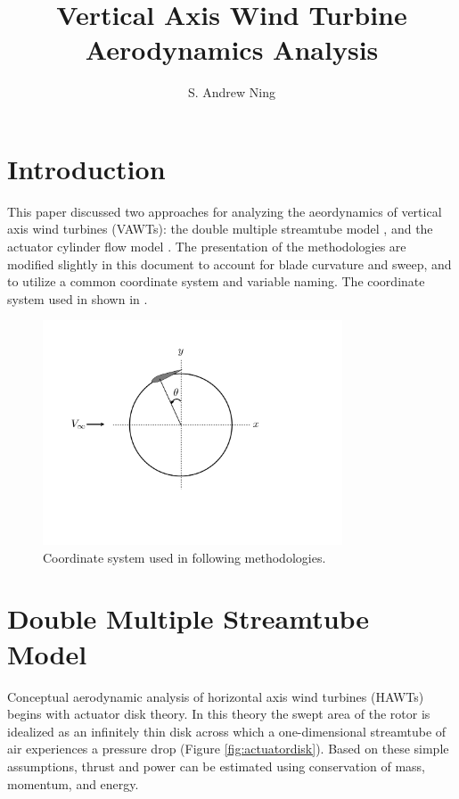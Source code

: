 \documentclass{article}
\begin{document}
\author{S. Andrew Ning}
\title{Vertical Axis Wind Turbine Aerodynamics Analysis}
\maketitle

\section{Introduction}

This paper discussed two approaches for analyzing the aeordynamics of vertical axis wind turbines (VAWTs): the double multiple streamtube model \cite{Paraschivoiu1983}, and the actuator cylinder flow model \cite{Madsen1982, Madsen2013}.  The presentation of the methodologies are modified slightly in this document to account for blade curvature and sweep, and to utilize a common coordinate system and variable naming.  The coordinate system used in shown in .

\begin{figure}[htbp]
\begin{center}
\includegraphics[width=3.5in]{images/coordinate}
\caption{Coordinate system used in following methodologies.}
\label{fig:coordinate}
\end{center}
\end{figure}

\section{Double Multiple Streamtube Model}
\label{sec:dmst}

Conceptual aerodynamic analysis of horizontal axis wind turbines (HAWTs) begins with actuator disk theory.  In this theory the swept area of the rotor is idealized as an infinitely thin disk across which a one-dimensional streamtube of air experiences a pressure drop (Figure \ref{fig:actuatordisk}).  Based on these simple assumptions, thrust and power can be estimated using conservation of mass, momentum, and energy.
\end{document}
